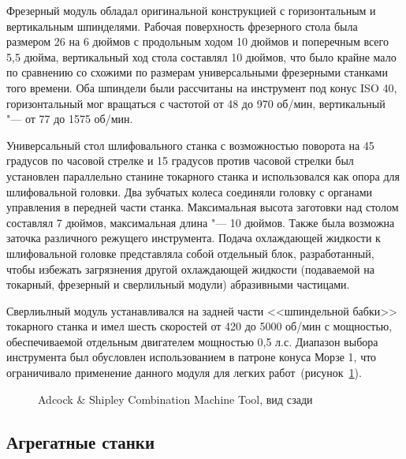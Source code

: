 Фрезерный модуль обладал оригинальной конструкцией с горизонтальным и вертикальным шпинделями. Рабочая поверхность фрезерного стола была размером 26 на 6 дюймов с продольным ходом 10 дюймов и поперечным всего 5,5 дюйма, вертикальный ход стола составлял 10 дюймов, что было крайне мало по сравнению со схожими по размерам универсальными фрезерными станками того времени. Оба шпиндели были рассчитаны на инструмент под конус ISO 40, горизонтальный мог вращаться с частотой от 48 до 970 об/мин, вертикальный "--- от 77 до 1575 об/мин.

Универсальный стол шлифовального станка с возможностью поворота на 45 градусов по часовой стрелке и 15 градусов против часовой стрелки был установлен параллельно станине токарного станка и использовался как опора для шлифовальной головки. Два зубчатых колеса соединяли головку с органами управления в передней части станка. Максимальная высота заготовки над столом составлял 7 дюймов, максимальная длина "--- 10 дюймов. Также была возможна заточка различного режущего инструмента. Подача охлаждающей жидкости к шлифовальной головке представляла собой отдельный блок, разработанный, чтобы избежать загрязнения другой охлаждающей жидкости (подаваемой на токарный, фрезерный и сверлильный модули) абразивными частицами.

Сверлиьлный модуль устанавливался на задней части <<шпиндельной бабки>> токарного станка и имел шесть скоростей от 420 до 5000 об/мин с мощностью, обеспечиваемой отдельным двигателем мощностью 0,5 л.с. Диапазон выбора инструмента был обусловлен использованием в патроне конуса Морзе 1, что ограничивало применение данного модуля для легких работ~(рисунок~\cref{fig:adcock-2}).

\begin{figure}[ht]
	\caption{Adcock \& Shipley Combination Machine Tool, вид сзади}\label{fig:adcock-2}
\end{figure}

\subsection{Агрегатные станки}

